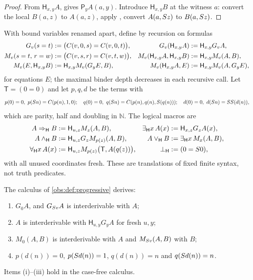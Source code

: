 \begin{proof}
From $\mathsf{H}_{x,y}A$,  gives $\mathsf{P}_{y}A(a,y)$. Introduce
$\mathsf{H}_{x,y}B$ at the witness $a$: convert the local $B(a,z)$ to $A(a,z)$,
apply , convert $A(a,S z)$ to $B(a,S z)$.
\end{proof}

\begin{definition}
\label{obs:def:Hmacros}
With bound variables renamed apart, define by recursion on formulas
\begin{align*}
G_v(s=t)&\mathrel{:=}\bigl(C(v,0,s)=C(v,0,t)\bigr), &
G_v(\mathsf{H}_{x,y}A)&\mathrel{:=}\mathsf{H}_{x,y}G_vA,\\
M_v(s=t,\,r=w)&\mathrel{:=}\bigl(C(v,s,r)=C(v,t,w)\bigr), &
M_v(\mathsf{H}_{x,y}A,\mathsf{H}_{x,y}B)&\mathrel{:=}\mathsf{H}_{x,y}M_v(A,B),\\
M_v(E,\mathsf{H}_{x,y}B)&\mathrel{:=}\mathsf{H}_{x,y}M_v(G_yE,B), &
M_v(\mathsf{H}_{x,y}A,E)&\mathrel{:=}\mathsf{H}_{x,y}M_v(A,G_yE),
\end{align*}
for equations $E$; the maximal binder depth decreases in each recursive call.
Let $\mathsf{T}=(0=0)$ and let $p,q,d$ be the terms with
\[
p(0)=0,\ p(S n)=C(p(n),1,0);\quad
q(0)=0,\ q(S n)=C(p(n),q(n),S(q(n)));\quad
d(0)=0,\ d(S n)=SS(d(n)),
\]
which are parity, half and doubling in $\mathbb{N}$. The logical macros are
\begin{align*}
A\Rightarrow_{\mathsf{H}}B&\mathrel{:=}\mathsf{H}_{u,z}M_z(A,B), &
\exists_{\mathsf{H}}x\,A(x)&\mathrel{:=}\mathsf{H}_{x,z}G_zA(x),\\
A\wedge_{\mathsf{H}}B&\mathrel{:=}\mathsf{H}_{u,z}G_zM_{p(z)}(A,B), &
A\vee_{\mathsf{H}}B&\mathrel{:=}\exists_{\mathsf{H}}x\,M_x(A,B),\\
\forall_{\mathsf{H}}x\,A(x)&\mathrel{:=}\mathsf{H}_{u,z}M_{p(z)}\bigl(\mathsf{T},A(q(z))\bigr), &
\bot_{\mathsf{H}}&\mathrel{:=}(0=S 0),
\end{align*}
with all unused coordinates fresh. These are translations of fixed finite
syntax, not truth predicates.
\end{definition}

\begin{lemma}
\label{obs:lem:Hgates}
The calculus of \cref{obs:def:progressive} derives:
\begin{enumerate}[label=(\roman*)]
\item $G_0A$, and $G_{S v}A$ is interderivable with $A$;
\item $A$ is interderivable with $\mathsf{H}_{u,y}G_yA$ for fresh $u,y$;
\item $M_0(A,B)$ is interderivable with $A$ and $M_{S v}(A,B)$ with $B$;
\item $p(d(n))=0$, $p(S d(n))=1$, $q(d(n))=n$ and $q(S d(n))=n$.
\end{enumerate}
Items (i)--(iii) hold in the case-free calculus.
\end{lemma}

